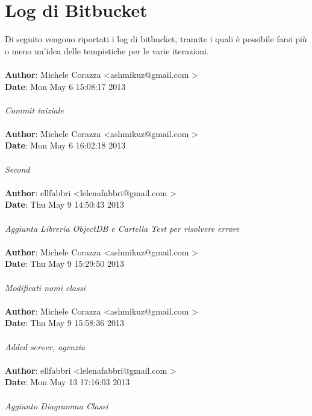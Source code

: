 \documentclass[a4paper,12pt]{article} %
\begin{document}
\section{Log di Bitbucket}
Di seguito vengono riportati i log di bitbucket, tramite i quali è possibile farsi più o meno un'idea delle tempistiche per le varie iterazioni.\\ 
\\
\textbf{Author}: Michele Corazza \textless ashmikuz@gmail.com \textgreater \\
\textbf{Date}:   Mon May 6 15:08:17 2013 \\
\\
    \emph{Commit iniziale}\\
\\
\textbf{Author}: Michele Corazza \textless ashmikuz@gmail.com \textgreater \\
\textbf{Date}:   Mon May 6 16:02:18 2013 \\
\\
    \emph{Second}\\
\\
\textbf{Author}: ellfabbri \textless lelenafabbri@gmail.com \textgreater \\
\textbf{Date}:   Thu May 9 14:50:43 2013 \\
\\
    \emph{Aggiunta Libreria ObjectDB e Cartella Test per risolvere errore}\\
\\
\textbf{Author}: Michele Corazza \textless ashmikuz@gmail.com \textgreater \\
\textbf{Date}:   Thu May 9 15:29:50 2013 \\
\\
    \emph{Modificati nomi classi}\\
\\
\textbf{Author}: Michele Corazza \textless ashmikuz@gmail.com \textgreater \\
\textbf{Date}:   Thu May 9 15:58:36 2013 \\
\\
    \emph{Added server, agenzia}\\
\\
\textbf{Author}: ellfabbri \textless lelenafabbri@gmail.com \textgreater \\
\textbf{Date}:   Mon May 13 17:16:03 2013 \\
\\
    \emph{Aggiunto Diagramma Classi}\\
\\
\end{document}
